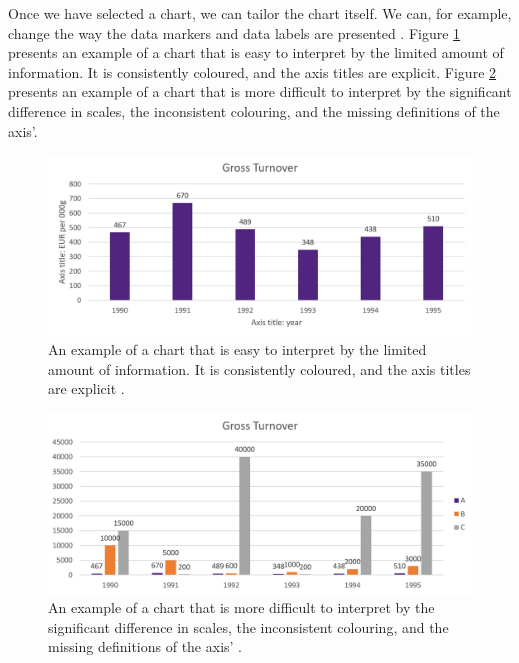 Once we have selected a chart, we can tailor the chart itself. We can, for example, change the way the data markers and data labels are presented \parencite{BI09}. Figure \ref{fig:tf_good_chart} presents an example of a chart that is easy to interpret by the limited amount of information. It is consistently coloured, and the axis titles are explicit. Figure \ref{fig:tf_bad_chart} presents an example of a chart that is more difficult to interpret by the significant difference in scales, the inconsistent colouring, and the missing definitions of the axis'.

\begin{figure}[H]
\centering
  \includegraphics[width=13cm]{../../Images/02_TF/02_TF_Good_Chart.png}
  \caption{An example of a chart that is easy to interpret by the limited amount of information. It is consistently coloured, and the axis titles are explicit \parencite{BI09}.}
  \label{fig:tf_good_chart}
\end{figure}

\begin{figure}[H]
\centering
  \includegraphics[width=13cm]{../../Images/02_TF/02_TF_Bad_Chart.png}
  \caption{An example of a chart that is more difficult to interpret by the significant difference in scales, the inconsistent colouring, and the missing definitions of the axis' \parencite{BI09}.}
  \label{fig:tf_bad_chart}
\end{figure}

